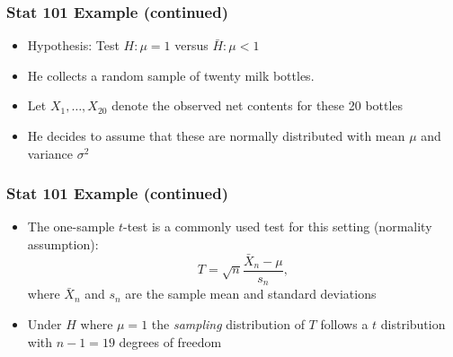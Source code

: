 \documentclass[xcolor=x11names,compress]{beamer}\usepackage[]{graphicx}\usepackage[]{color}
\begin{document}
\begin{frame}
  \frametitle{Stat 101 Example (continued)}
  \begin{itemize}
  \item Hypothesis: Test $H: \mu =1$ versus $\bar{H}: \mu < 1$
  \item He collects a random sample of twenty milk bottles.
  \item Let $X_1,\ldots,X_{20}$ denote the observed net contents
        for these 20 bottles
  \item He decides to assume that these are normally distributed
        with mean $\mu$ and variance $\sigma^2$
  \end{itemize}
\end{frame}

\begin{frame}
  \frametitle{Stat 101 Example (continued)}
  \begin{itemize}
  \item The one-sample $t$-test is a commonly used test for this
        setting (normality assumption):
        \begin{equation}
          T=\sqrt{n}\frac{\bar{X}_n-\mu}{s_n},
        \end{equation}
        where $\bar{X}_n$ and $s_n$ are the sample mean and standard
        deviations
  \item Under $H$ where $\mu=1$ the {\it sampling} distribution of $T$
        follows a $t$ distribution with $n-1=19$ degrees of freedom
  \end{itemize}
\end{frame}



\end{document}
